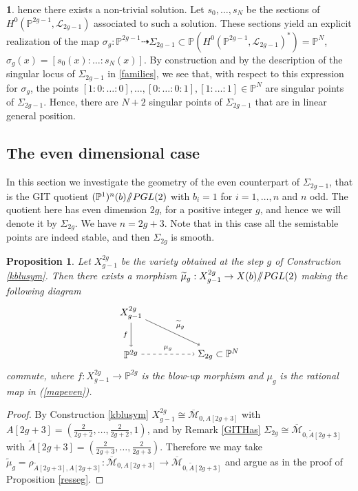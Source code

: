 \documentclass[a4paper,10pt]{amsart}
\newtheorem{Proposition}[thm]{Proposition}
\theoremstyle{definition}
\newtheorem{say}[thm]{}
\newcommand{\cM}{\overline{\mathcal{M}}}
\newcommand{\quot}{/\hspace{-1.2mm}/}
\begin{document}
\begin{say}
hence there exists a non-trivial solution. Let $s_0,\dots,s_N$ be the sections of $H^{0}(\mathbb{P}^{2g-1},\mathcal{L}_{2g-1})$ associated to such a solution. These sections yield an explicit realization of the map $\sigma_g:\mathbb{P}^{2g-1}\dasharrow \Sigma_{2g-1}\subset \mathbb{P}(H^{0}(\mathbb{P}^{2g-1},\mathcal{L}_{2g-1})^{*}) = \mathbb{P}^N$, $\sigma_g(x)= [s_0(x):\dots:s_N(x)]$. By construction and by the description of the singular locus of $\Sigma_{2g-1}$ in \ref{families}, we see that, with respect to this expression for $\sigma_g$, the points $[1:0:\dots:0],\dots,[0:\dots:0:1],[1:\dots:1]\in \mathbb{P}^N$ are singular points of $\Sigma_{2g-1}$. Hence, there are $N+2$ singular points of $\Sigma_{2g-1}$ that are in linear general position.
\end{say}

\subsection{The even dimensional case}\label{evenio} 
In this section we investigate the geometry of the even counterpart of $\Sigma_{2g-1}$, that is the GIT quotient $(\mathbb{P}^1)^n(b)\quot PGL(2)$ with $b_i = 1$ for $i=1,\dots,n$ and $n$ odd. The quotient here has even dimension $2g$, for a positive integer $g$, and hence we will denote it by $\Sigma_{2g}$. We have $n=2g+3$. Note that in this case all the semistable points are indeed stable, and then $\Sigma_{2g}$ is smooth. 

\begin{Proposition}\label{resodd}
Let $X^{2g}_{g-1}$ be the variety obtained at the step $g$ of Construction \ref{kblusym}. Then there exists a morphism $\widetilde{\mu}_g:X^{2g}_{g-1}\rightarrow X(b)\quot PGL(2)$ making the following diagram  
\[
  \begin{tikzpicture}[xscale=3.2,yscale=-1.5]
    \node (A0_0) at (0, 0) {$X^{2g}_{g-1}$};
    \node (A1_0) at (0, 1) {$\mathbb{P}^{2g}$};
    \node (A1_1) at (1, 1) {$\Sigma_{2g}\subset\mathbb{P}^N$};
    \path (A0_0) edge [->,swap]node [auto] {$\scriptstyle{f}$} (A1_0);
    \path (A1_0) edge [->,dashed]node [auto] {$\scriptstyle{\mu_g}$} (A1_1);
    \path (A0_0) edge [->]node [auto] {$\scriptstyle{\widetilde{\mu}_g}$} (A1_1);
  \end{tikzpicture}
  \]
commute, where $f:X^{2g}_{g-1}\rightarrow\mathbb{P}^{2g}$ is the blow-up morphism and $\mu_g$ is the rational map in (\ref{mapeven}).
\end{Proposition}
\begin{proof}
By Construction \ref{kblusym} $X^{2g}_{g-1}\cong\cM_{0,A[2g+3]}$ with $A[2g+3] =  \left(\frac{2}{2g+2},\dots,\frac{2}{2g+2},1\right)$, and by Remark \ref{GITHas} $\Sigma_{2g}\cong \cM_{0,\widetilde{A}[2g+3]}$ with $\widetilde{A}[2g+3]=\left(\frac{2}{2g+3},\dots,\frac{2}{2g+3}\right)$. Therefore we may take $\widetilde{\mu}_g = \rho_{\widetilde{A}[2g+3],A[2g+3]}:\cM_{0,A[2g+3]}\rightarrow\cM_{0,\widetilde{A}[2g+3]}$ and argue as in the proof of Proposition \ref{resseg}.
\end{proof}
\end{document}
